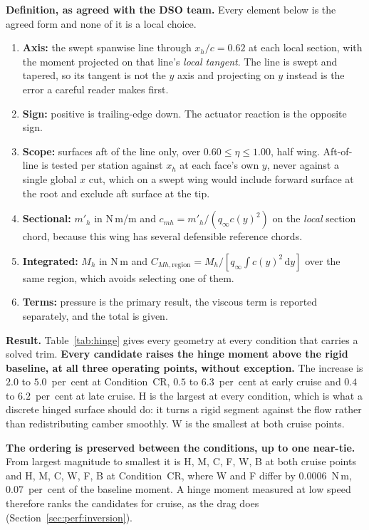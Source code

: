 \textbf{Definition, as agreed with the DSO team.} Every element below is the agreed form and none
of it is a local choice.

\begin{enumerate}
  \item \textbf{Axis:} the swept spanwise line through $x_h/c = 0.62$ at each local section, with
    the moment projected on that line's \emph{local tangent}. The line is swept and tapered, so
    its tangent is not the $y$ axis and projecting on $y$ instead is the error a careful reader
    makes first.
  \item \textbf{Sign:} positive is trailing-edge down. The actuator reaction is the opposite sign.
  \item \textbf{Scope:} surfaces aft of the line only, over $0.60 \leq \eta \leq 1.00$, half wing.
    Aft-of-line is tested per station against $x_h$ at each face's own $y$, never against a single
    global $x$ cut, which on a swept wing would include forward surface at the root and exclude
    aft surface at the tip.
  \item \textbf{Sectional:} $m'_h$ in N\,m/m and $c_{mh} = m'_h/(q_\infty c(y)^2)$ on the
    \emph{local} section chord, because this wing has several defensible reference chords.
  \item \textbf{Integrated:} $M_h$ in N\,m and
    $C_{Mh,\mathrm{region}} = M_h/[q_\infty\!\int\! c(y)^2\,\mathrm{d}y]$ over the same region,
    which avoids selecting one of them.
  \item \textbf{Terms:} pressure is the primary result, the viscous term is reported separately,
    and the total is given.
\end{enumerate}

\textbf{Result.} Table~\ref{tab:hinge} gives every geometry at every condition that carries a
solved trim. \textbf{Every candidate raises the hinge moment above the rigid baseline, at all
three operating points, without exception.} The increase is $2.0$ to $5.0$~per~cent at Condition~CR,
$0.5$ to $6.3$~per~cent at early cruise and $0.4$ to $6.2$~per~cent at late cruise. H is the
largest at every condition, which is what a discrete hinged surface should do: it turns a rigid
segment against the flow rather than redistributing camber smoothly. W is the smallest at both
cruise points.

\textbf{The ordering is preserved between the conditions, up to one near-tie.} From largest
magnitude to smallest it is H, M, C, F, W, B at both cruise points and H, M, C, W, F, B at
Condition~CR, where W and F differ by $0.0006$~N\,m, $0.07$~per~cent of the baseline moment. A
hinge moment measured at low speed therefore ranks the candidates for cruise, as the drag does
(Section~\ref{sec:perf:inversion}).

